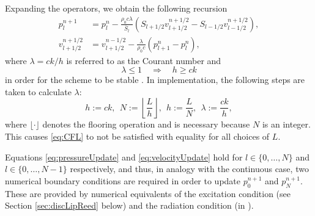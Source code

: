 Expanding the operators, we obtain the following recursion
\begin{subequations}\label{eq:updateNormal}
    \begin{align}
        p_l^{n+1} &= p_l^n - \frac{\rho_0 c \lambda}{\bar{S}_l}(S_{l+1/2}v_{l+1/2}^{n+1/2}-S_{l-1/2}v_{l-1/2}^{n+1/2}),\label{eq:pressureUpdate}\\
        v_{l+1/2}^{n+1/2} &= v_{l+1/2}^{n-1/2}-\frac{\lambda}{\rho_0 c}(p_{l+1}^n - p_l^n),\label{eq:velocityUpdate}
    \end{align}
\end{subequations}
where $\lambda = ck/h$ is referred to as the Courant number and
\begin{equation}\label{eq:CFL}
    \lambda \leq 1 \quad\Longrightarrow \quad  h\geq ck
\end{equation}
in order for the scheme to be stable \cite{bilbao2009}. In implementation, the following steps are taken to calculate $\lambda$:
\begin{equation}\label{eq:orderOfCalcGrid}
    h := ck,\ \ N := \left\lfloor\frac{L}{h}\right\rfloor, \ \ h := \frac{L}{N}, \ \ \lambda := \frac{ck}{h},
\end{equation}
where $\lfloor \cdot \rfloor$ denotes the flooring operation and is necessary because $N$ is an integer. This causes \eqref{eq:CFL} to not be satisfied with equality for all choices of $L$.

Equations \eqref{eq:pressureUpdate} and \eqref{eq:velocityUpdate} hold for $l\in \{0,\hdots,N\}$ and $l\in\{0,\hdots,N-1\}$ respectively, and thus, in analogy with the continuous case, two numerical boundary conditions are required in order to update $p_{0}^{n+1}$ and $p_{N}^{n+1}$. These are provided by numerical equivalents of the excitation condition (see Section \ref{sec:discLipReed} below) and the radiation condition (in \cite{Harrison2018}).


